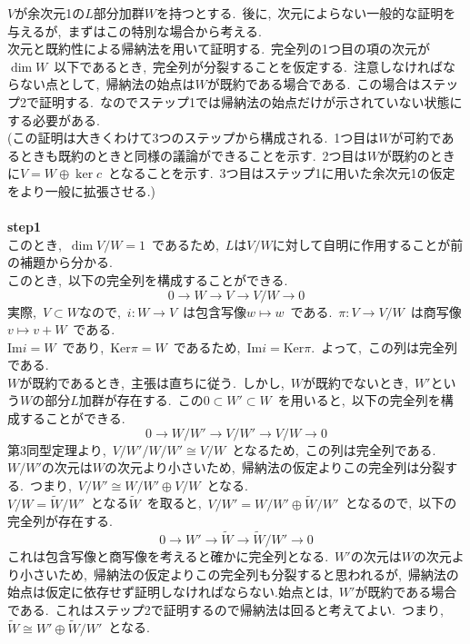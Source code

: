 \documentclass[uplatex,dvipdfmx]{jsarticle}
\begin{document}
\begin{myproof}
    $V$が余次元1の$L$部分加群$W$を持つとする.~後に,~次元によらない一般的な証明を与えるが,~まずはこの特別な場合から考える.\\
    次元と既約性による帰納法を用いて証明する.~完全列の1つ目の項の次元が$\dim W$~以下であるとき,~完全列が分裂することを仮定する.~注意しなければならない点として,~帰納法の始点は$W$が既約である場合である.~この場合はステップ2で証明する.~なのでステップ1では帰納法の始点だけが示されていない状態にする必要がある.\\
    (この証明は大きくわけて3つのステップから構成される.~1つ目は$W$が可約であるときも既約のときと同様の議論ができることを示す.~2つ目は$W$が既約のときに$V =W \oplus \ker c$~となることを示す.~3つ目はステップ1に用いた余次元1の仮定をより一般に拡張させる.)\\\\
    \textbf{step1}\\
    このとき,~$\dim V/W = 1$~であるため,~$L$は$V/W$に対して自明に作用することが前の補題から分かる.\\
    このとき,~以下の完全列を構成することができる.
    \begin{equation*}
        0 \to W \to V \to V/W \to 0
    \end{equation*}
    実際,~$V\subset W$なので,~$i :W \to V$~は包含写像$w\mapsto w$~である.~$\pi : V \to V/W$~は商写像$v\mapsto v+W$~である.\\
    $\text{Im}i = W$~であり,~$\text{Ker}\pi = W$~であるため,~$\text{Im}i = \text{Ker}\pi$.~よって,~この列は完全列である.\\
    $W$が既約であるとき,~主張は直ちに従う.~しかし,~$W$が既約でないとき,~$W'$という$W$の部分$L$加群が存在する.~この$0 \subset W' \subset W$~を用いると,~以下の完全列を構成することができる.
    \begin{equation*}
        0 \to W/W' \to V/W' \to V/W \to 0
    \end{equation*}
    第3同型定理より,~$V/W' / W/W' \cong V/W$~となるため,~この列は完全列である.\\
    $W/W'$の次元は$W$の次元より小さいため,~帰納法の仮定よりこの完全列は分裂する.~つまり,~$V/W' \cong W/W' \oplus V/W$~となる.\\
    $V/W = \tilde{W}/W'$~となる$\tilde{W}$~を取ると,~$V/W' = W/W' \oplus \tilde{W}/W'$~となるので,~以下の完全列が存在する.
    \begin{equation*}
        0 \to W' \to \tilde{W} \to \tilde{W}/W' \to 0
    \end{equation*}
    これは包含写像と商写像を考えると確かに完全列となる.~$W'$の次元は$W$の次元より小さいため,~帰納法の仮定よりこの完全列も分裂すると思われるが,~帰納法の始点は仮定に依存せず証明しなければならない.始点とは,~$W'$が既約である場合である.~これはステップ2で証明するので帰納法は回ると考えてよい.~つまり,~$\tilde{W} \cong W' \oplus \tilde{W}/W'$~となる.\\

\end{myproof}
\end{document}
